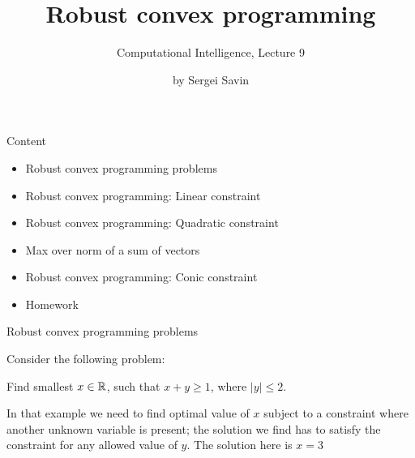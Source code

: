 \documentclass{beamer}
\title{ Robust convex programming }
\subtitle{Computational Intelligence, Lecture 9}
\author{by Sergei Savin}
\date{\mydate}
\begin{document}
\maketitle



\begin{frame}{Content}

\begin{itemize}
 \item Robust convex programming problems
 \item Robust convex programming: Linear constraint
 \item Robust convex programming: Quadratic constraint
 \item Max over norm of a sum of vectors
 \item Robust convex programming: Conic constraint
\item Homework
\end{itemize}

\end{frame}



\begin{frame}{Robust convex programming problems}
\begin{flushleft}

Consider the following problem: 

\begin{example}
Find smallest $x \in \mathbb{R}$, such that $x + y \geq 1$, where $|y| \leq 2$.
\end{example}

\bigskip

In that example we need to find optimal value of $x$ subject to a constraint where another unknown variable is present; the solution we find has to satisfy the constraint for any allowed value of $y$. The solution here is $x = 3$

 
\end{flushleft}
\end{frame}
\end{document}
